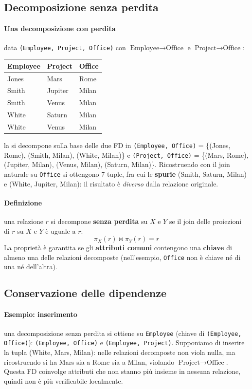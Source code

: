 \documentclass[a4paper,12pt]{article}
\begin{document}
\subsection{Decomposizione senza perdita}

\paragraph{Una decomposizione con perdita} data \texttt{(Employee, Project,
Office)} con $\text{Employee} \to \text{Office}$ e $\text{Project} \to
\text{Office}$:
\begin{center}
\begin{tabular}{|l|l|l|}
\hline
Employee & Project & Office\\ \hline
Jones & Mars & Rome\\ Smith & Jupiter & Milan\\ Smith & Venus & Milan\\
White & Saturn & Milan\\ White & Venus & Milan\\ \hline
\end{tabular}
\end{center}
la si decompone sulla base delle due FD in \texttt{(Employee, Office)} =
\{(Jones, Rome), (Smith, Milan), (White, Milan)\} e \texttt{(Project, Office)}
= \{(Mars, Rome), (Jupiter, Milan), (Venus, Milan), (Saturn, Milan)\}.
Ricostruendo con il join naturale su \texttt{Office} si ottengono 7 tuple,
fra cui le \textbf{spurie} (Smith, Saturn, Milan) e (White, Jupiter, Milan):
il risultato è \emph{diverso} dalla relazione originale.

\paragraph{Definizione} una relazione $r$ si decompone \textbf{senza perdita}
su $X$ e $Y$ se il join delle proiezioni di $r$ su $X$ e $Y$ è uguale a $r$:
\[ \pi_X(r) \bowtie \pi_Y(r) = r \]
La proprietà è garantita se gli \textbf{attributi comuni} contengono una
\textbf{chiave} di almeno una delle relazioni decomposte (nell'esempio,
\texttt{Office} non è chiave né di una né dell'altra).

\subsection{Conservazione delle dipendenze}

\paragraph{Esempio: inserimento} una decomposizione senza perdita si ottiene
su \texttt{Employee} (chiave di \texttt{(Employee, Office)}):
\texttt{(Employee, Office)} e \texttt{(Employee, Project)}. Supponiamo di
inserire la tupla (White, Mars, Milan): nelle relazioni decomposte non viola
nulla, ma ricostruendo si ha Mars sia a Rome sia a Milan, violando
$\text{Project} \to \text{Office}$. Questa FD coinvolge attributi che non
stanno più insieme in nessuna relazione, quindi non è più verificabile
localmente.
\end{document}
